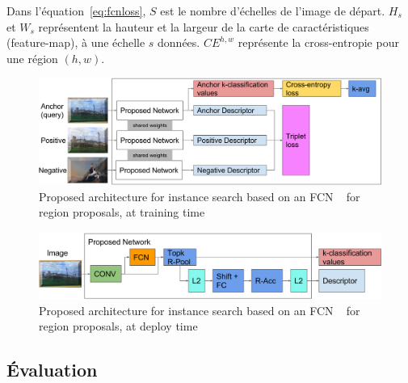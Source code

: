 Dans l'équation~\ref{eq:fcnloss}, $S$ est le nombre d'échelles de l'image de départ.
$H_s$ et $W_s$ représentent la hauteur et la largeur de la carte de caractéristiques (feature-map), à une échelle $s$ données.
$CE^{h,w}$ représente la cross-entropie pour une région $(h,w)$.

\begin{figure}
    \includegraphics[width=\linewidth]{figures/contrib_train.png}
    \caption{Proposed architecture for instance search based on an FCN ~\cite{long_fully_2015} for region proposals, at training time
    \label{fig:contribtrain}}
\end{figure}










\begin{figure}
\centering
    \includegraphics[width=\linewidth]{figures/contrib_deploy.png}
    \caption{Proposed architecture for instance search based on an FCN
~\cite{long_fully_2015} for region proposals, at deploy time
    \label{fig:contribdeploy}}
\end{figure}

\subsection{Évaluation}









